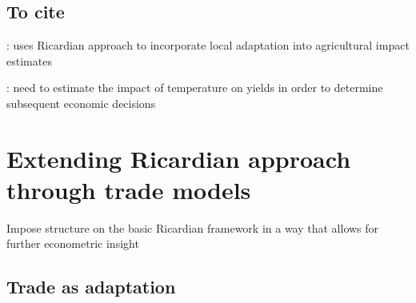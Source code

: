 \documentclass[10 pt]{article}
\begin{document}
\subsection{To cite}

\textcite{SR09,BS17,DG07,SL10,ZDMZ18}
\begin{blist}

\item \textcite{C07}: uses Ricardian approach to incorporate local adaptation into agricultural impact estimates

\item \textcite{SR09}: need to estimate the impact of temperature on yields in order to determine subsequent economic decisions
\end{blist}

\section{Extending Ricardian approach through trade models}

\begin{blist}

\item Impose structure on the basic Ricardian framework in a way that allows for further econometric insight

\end{blist}

\subsection{Trade as adaptation}
\end{document}
